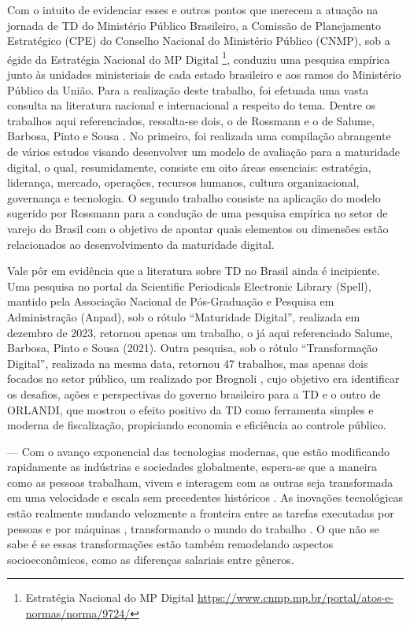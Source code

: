 Com o intuito de evidenciar esses e outros pontos que merecem a atuação na jornada de TD do Ministério Público Brasileiro, a Comissão de Planejamento Estratégico (CPE) do Conselho Nacional do Ministério Público (CNMP), sob a égide da Estratégia Nacional do MP Digital \footnote{Estratégia Nacional do MP Digital \url{https://www.cnmp.mp.br/portal/atos-e-normas/norma/9724/}}, conduziu uma pesquisa empírica junto às unidades ministeriais de cada estado brasileiro e aos ramos do Ministério Público da União. Para a realização deste trabalho, foi efetuada uma vasta consulta na literatura nacional e internacional a respeito do tema. Dentre os trabalhos aqui referenciados, ressalta-se dois, o de Rossmann \cite{rossmann2018digital} e o de Salume, Barbosa, Pinto e Sousa \cite{salume2021key}. No primeiro, foi realizada uma compilação abrangente de vários estudos visando desenvolver um modelo de avaliação para a maturidade digital, o qual, resumidamente, consiste em oito áreas essenciais: estratégia, liderança, mercado, operações, recursos humanos, cultura organizacional, governança e tecnologia. O segundo trabalho consiste na aplicação do modelo sugerido por Rossmann \cite{rossmann2018digital} para a condução de uma pesquisa empírica no setor de varejo do Brasil com o objetivo de apontar quais elementos ou dimensões estão relacionados ao desenvolvimento da maturidade digital.

Vale pôr em evidência que a literatura sobre TD no Brasil ainda é incipiente. Uma pesquisa no portal da Scientific Periodicals Electronic Library (Spell), mantido pela Associação Nacional de Pós-Graduação e Pesquisa em Administração (Anpad), sob o rótulo “Maturidade Digital”, realizada em dezembro de 2023, retornou apenas um trabalho, o já aqui referenciado Salume, Barbosa, Pinto e Sousa (2021). Outra pesquisa, sob o rótulo “Transformação Digital”, realizada na mesma data, retornou 47 trabalhos, mas apenas dois focados no setor público, um realizado por Brognoli \cite{da2020transformaccao}, cujo objetivo era identificar os desafios, ações e perspectivas do governo brasileiro para a TD e o outro de ORLANDI, que mostrou o efeito positivo da TD como ferramenta simples e moderna de fiscalização, propiciando economia e eficiência ao controle público.

---
Com o avanço exponencial das tecnologias modernas, que estão modificando rapidamente as indústrias e sociedades globalmente, espera-se que a maneira como as pessoas trabalham, vivem e interagem com as outras seja transformada em uma velocidade e escala sem precedentes históricos \cite{hand1981artificial}. As inovações tecnológicas estão realmente mudando velozmente a fronteira entre as tarefas executadas por pessoas e por máquinas , transformando o mundo do trabalho \cite{aksoy2021robots}. O que não se sabe é se essas transformações estão também remodelando aspectos socioeconômicos, como as diferenças salariais entre gêneros.

